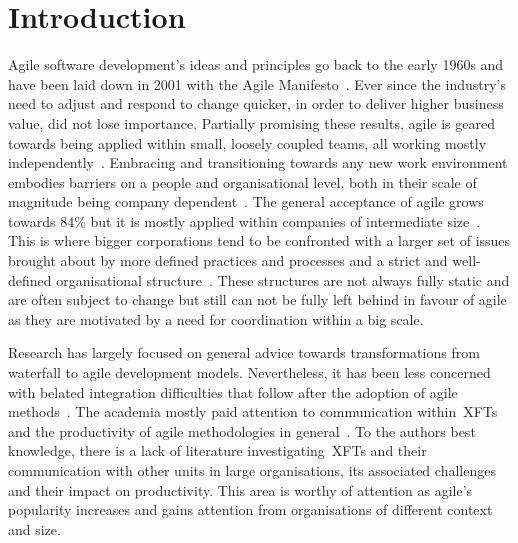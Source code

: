 \chapter{Introduction}

Agile software development's ideas and principles go back to the early 1960s and have been laid down in 2001 with the Agile Manifesto~\citep{beck2001agile}. Ever since the industry's need to adjust and respond to change quicker, in order to deliver higher business value, did not lose importance. Partially promising these results, agile is geared towards being applied within small, loosely coupled teams, all working mostly independently~\citep{stober2009agile}. Embracing and transitioning towards any new work environment embodies barriers on a people and organisational level, both in their scale of magnitude being company dependent~\citep{schiel2009enterprise}. The general acceptance of agile grows towards 84\% but it is mostly applied within companies of intermediate size~\citep{7thagilesur}. This is where bigger corporations tend to be confronted with a larger set of issues brought about by more defined practices and processes and a strict and well-defined organisational structure~\citep{schiel2009enterprise}. These structures are not always fully static and are often subject to change but still can not be fully left behind in favour of agile as they are motivated by a need for coordination within a big scale.

Research has largely focused on general advice towards transformations from waterfall to agile development models. Nevertheless, it has been less concerned with belated integration difficulties that follow after the adoption of agile methods~\citep{ivari2011orgagile}. The academia mostly paid attention to communication within~\acp{XFT}~\citep{stray2012investigatingdailyteam, kauffeld2011meetingsmatter, pikkarainen2008impactagilecommunication} and the productivity of agile methodologies in general~\citep{badampudi2013proddelay, leffingwell2007scalelargecorps}. To the authors best knowledge, there is a lack of literature investigating~\acp{XFT} and their communication with other units in large organisations, its associated challenges and their impact on productivity. 
This area is worthy of attention as agile's popularity increases and gains attention from organisations of different context and size.

